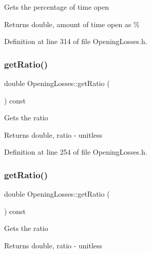 Gets the percentage of time open

\begin{DoxyReturn}{Returns}
double, amount of time open as \% 
\end{DoxyReturn}


Definition at line 314 of file Opening\+Losses.\+h.

\mbox{\label{class_opening_losses_ac9f7dbd2cc023932b5d8076a21a3f690}} 
\subsubsection{\texorpdfstring{get\+Ratio()}{getRatio()}\hspace{0.1cm}{\footnotesize\ttfamily [1/3]}}
{\footnotesize\ttfamily double Opening\+Losses\+::get\+Ratio (\begin{DoxyParamCaption}{ }\end{DoxyParamCaption}) const\hspace{0.3cm}{\ttfamily [inline]}}

Gets the ratio

\begin{DoxyReturn}{Returns}
double, ratio -\/ unitless 
\end{DoxyReturn}


Definition at line 254 of file Opening\+Losses.\+h.

\mbox{\label{class_opening_losses_ac9f7dbd2cc023932b5d8076a21a3f690}} 
\subsubsection{\texorpdfstring{get\+Ratio()}{getRatio()}\hspace{0.1cm}{\footnotesize\ttfamily [2/3]}}
{\footnotesize\ttfamily double Opening\+Losses\+::get\+Ratio (\begin{DoxyParamCaption}{ }\end{DoxyParamCaption}) const\hspace{0.3cm}{\ttfamily [inline]}}

Gets the ratio

\begin{DoxyReturn}{Returns}
double, ratio -\/ unitless 
\end{DoxyReturn}


